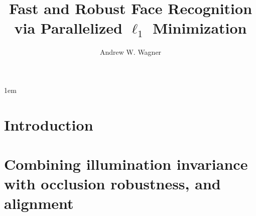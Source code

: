 \documentclass[draftthesis,tocnosub,noragright,centerchapter,12pt]{uiucecethesis09}
\title{Fast and Robust Face Recognition \\
		via Parallelized $\ell_1$ Minimization}
\author{Andrew W. Wagner}
\begin{document}

\maketitle

\parindent 1em%

\frontmatter

\begin{abstract}
 
\end{abstract}


%

\tableofcontents





\mainmatter

\chapter{Introduction}
\label{chap:introduction}


\chapter{Combining illumination invariance with occlusion robustness, and alignment}
\label{chap:cvpr}

\end{document}
